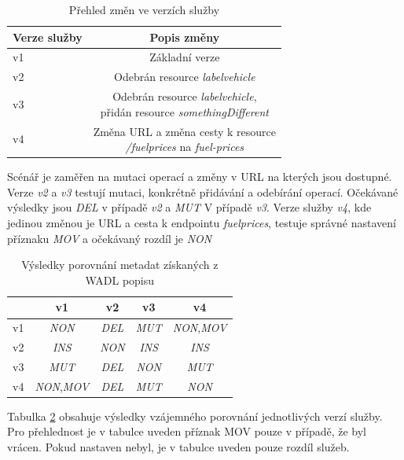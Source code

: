\documentclass[czech,DP]{thesiskiv}
\begin{document}
\begin{table}[h]
	\centering
	\begin{tabular}{|l|c|}
		\hline
		Verze služby & Popis změny \\
		\hline
		\hline
		v1 & Základní verze \\
		\hline
		v2 & Odebrán resource \textit{labelvehicle} \\
		\hline
		v3 & \makecell{Odebrán resource \textit{labelvehicle}, \\ přidán resource \textit{somethingDifferent}} \\
		\hline
		v4 & \makecell{Změna URL a změna cesty k resource \\ \textit{/fuelprices} na \textit{fuel-prices}}  \\
		\hline
	\end{tabular}
	\caption{Přehled změn ve verzích služby}
	\label{tab:wadl-diffs}
\end{table}

Scénář je zaměřen na mutaci operací a změny v URL na kterých jsou dostupné. Verze \textit{v2} a \textit{v3} testují mutaci, konkrétně přidávání a odebírání operací. Očekávané výsledky jsou \textit{DEL} v případě \textit{v2} a \textit{MUT} V případě \textit{v3}. Verze služby \textit{v4}, kde jedinou změnou je URL a cesta k endpointu \textit{fuelprices}, testuje správné nastavení příznaku \textit{MOV} a očekávaný rozdíl je \textit{NON}

\begin{table}[h]
	\centering
	\begin{tabular}{|l||c|c|c|c|}
		\hline
		& v1 & v2 & v3 & v4 \\
		\hline
		\hline
		v1 & \textit{NON} & \textit{DEL} & \textit{MUT} & \textit{NON},\textit{MOV} \\
		\hline
		v2 & \textit{INS} & \textit{NON} & \textit{INS} & \textit{INS} \\
		\hline
		v3 & \textit{MUT} & \textit{DEL} & \textit{NON} & \textit{MUT} \\
		\hline
		v4 & \textit{NON},\textit{MOV} & \textit{DEL} & \textit{MUT} & \textit{NON} \\
		\hline
	\end{tabular}
	\caption{Výsledky porovnání metadat získaných z WADL popisu}
	\label{tab:wadl-cmp-res}
\end{table} 

Tabulka \ref{tab:wadl-cmp-res} obsahuje výsledky vzájemného porovnání jednotlivých verzí služby. Pro přehlednost je v tabulce uveden příznak MOV pouze v případě, že byl vrácen. Pokud nastaven nebyl, je v tabulce uveden pouze rozdíl služeb. 
\end{document}
